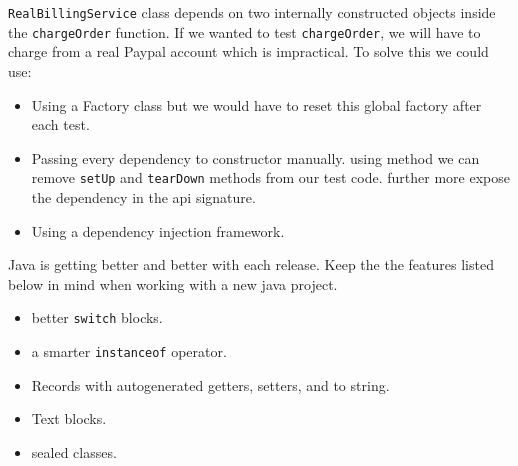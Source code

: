 \documentclass[a4paper]{article}
\begin{document}
\lstinline{RealBillingService} class depends on two internally constructed objects inside the \lstinline{chargeOrder}
function. If we wanted to test \lstinline{chargeOrder}, we will have to charge from a real Paypal account which is
impractical. To solve this we could use:

\begin{itemize}
    \item Using a Factory class but we would have to reset this global factory after each test.
    \item Passing every dependency to constructor manually. using method we can remove \lstinline{setUp} and \lstinline{tearDown}
          methods from our test code. further more expose the dependency in the api signature.
    \item Using a dependency injection framework.
\end{itemize}

Java is getting better and better with each release. Keep the the features listed below in mind when working with a new
java project.
\begin{itemize}
    \item better \lstinline{switch} blocks.
    \item a smarter \lstinline{instanceof} operator.
    \item Records with autogenerated getters, setters, and to string.
    \item Text blocks.
    \item sealed classes.
\end{itemize}
\end{document}
